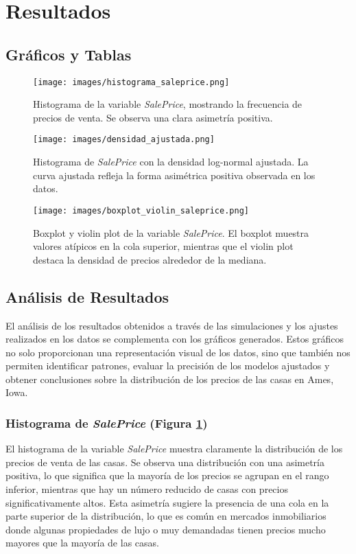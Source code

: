 \documentclass[12pt]{article}
\begin{document}
\newpage

\section{Resultados}
\subsection{Gráficos y Tablas}



\begin{figure}[H]
    \centering
    \texttt{[image: images/histograma\_saleprice.png]}
    \caption{Histograma de la variable \textit{SalePrice}, mostrando la frecuencia de precios de venta. Se observa una clara asimetría positiva.}
    \label{fig:histograma}
\end{figure}

\begin{figure}[H]
    \centering
    \texttt{[image: images/densidad\_ajustada.png]}
    \caption{Histograma de \textit{SalePrice} con la densidad log-normal ajustada. La curva ajustada refleja la forma asimétrica positiva observada en los datos.}
    \label{fig:densidad_ajustada}
\end{figure}

\begin{figure}[H]
    \centering
    \texttt{[image: images/boxplot\_violin\_saleprice.png]}
    \caption{Boxplot y violin plot de la variable \textit{SalePrice}. El boxplot muestra valores atípicos en la cola superior, mientras que el violin plot destaca la densidad de precios alrededor de la mediana.}
    \label{fig:boxplot_violin}
\end{figure}


\subsection{Análisis de Resultados}

El análisis de los resultados obtenidos a través de las simulaciones y los ajustes realizados en los datos se complementa con los gráficos generados. Estos gráficos no solo proporcionan una representación visual de los datos, sino que también nos permiten identificar patrones, evaluar la precisión de los modelos ajustados y obtener conclusiones sobre la distribución de los precios de las casas en Ames, Iowa.

\subsubsection{Histograma de \textit{SalePrice} (Figura \ref{fig:histograma})}
El histograma de la variable \textit{SalePrice} muestra claramente la distribución de los precios de venta de las casas. Se observa una distribución con una asimetría positiva, lo que significa que la mayoría de los precios se agrupan en el rango inferior, mientras que hay un número reducido de casas con precios significativamente altos. Esta asimetría sugiere la presencia de una cola en la parte superior de la distribución, lo que es común en mercados inmobiliarios donde algunas propiedades de lujo o muy demandadas tienen precios mucho mayores que la mayoría de las casas.
\end{document}
